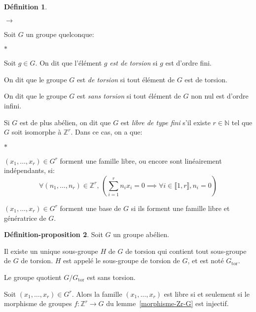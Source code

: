 \documentclass{report}
\newcommand{\Z}{\mathbb{Z}}
\newcommand{\N}{\mathbb{N}}
\newcommand{\Gt}{G_{\mathrm{tor}}}
\newcommand{\dis}{\displaystyle}
\newenvironment{ls}{\begin{list}{$\to$}{}}{\end{list}}
\newenvironment{lls}{\begin{list}{$\ast$}{}}{\end{list}}
\newcommand{\nt}[1]{\llbracket  #1 \rrbracket }
\theoremstyle{definition}
\newtheorem{defi}{Définition}[chapter]
\newtheorem{depro}[defi]{Définition-proposition}
\begin{document}
\begin{defi}\hspace{.1em}
\begin{ls}
\item Soit $G$ un groupe quelconque:
\begin{lls}
\item Soit $g \in G$. On dit que l'élément $g$ \textit{est de torsion} si $g$ est d'ordre fini.
\item On dit que le groupe $G$ est \textit{de torsion} si tout élément de $G$ est de torsion.
\item On dit que le groupe $G$ est \textit{sans torsion} si tout élément de $G$ non nul est d'ordre infini.
\end{lls}

\item Si $G$ est de plus abélien, on dit que $G$ est \textit{libre de type fini} s'il existe $r \in \N$ tel que $G$ soit isomorphe à $\Z^r$.\bigbreak
Dans ce cas, on a que:
\begin{lls}
\item $(x_1, \ldots, x_r) \in G^r$ forment une famille libre, ou encore sont linéairement indépendants, si:
$$\forall (n_1, \ldots, n_r) \in \Z^r,\, \left(\dis \sum_{i=1}^r n_ix_i=0\implies\forall i \in \nt{1,r}, n_i=0\right)$$
\item $(x_1, \ldots, x_r) \in G^r$ forment une base de $G$ si ils forment une famille libre et génératrice de $G$.
\end{lls}
\end{ls}
\end{defi}

\begin{depro}\label{def-groupe-torsion}
Soit $G$ un groupe abélien.
\begin{point}
\item Il existe un unique sous-groupe $H$ de $G$ de torsion qui contient tout sous-groupe de $G$ de torsion. $H$ est appelé le sous-groupe de torsion de $G$, et est noté $\Gt$.
\item Le groupe quotient $G/\Gt$ est sans torsion.
\item Soit $(x_1, \ldots, x_r)  \in G^r$. Alors la famille  $(x_1, \ldots, x_r)$ est libre si et seulement si le morphisme de groupes $f:\Z^r\to G$ du lemme~\ref{morphisme-Zr-G} est injectif.
\end{point}
\end{depro}
\end{document}
